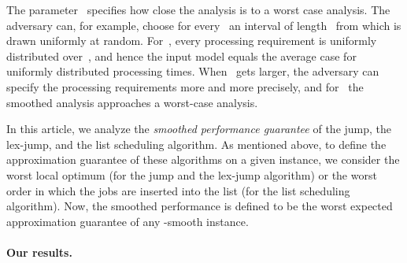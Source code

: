 \documentclass[a4paper,11pt,fleqn]{article}
\begin{document}
The parameter~ specifies how close the analysis is to a worst case analysis. The adversary can, for example, choose for every~ an interval of length~ from which  is drawn uniformly at random. For~, every processing requirement is uniformly distributed over~, and hence the input model equals the average case for uniformly distributed processing times. When~ gets larger, the adversary can specify the processing requirements more and more precisely, and for~ the smoothed analysis approaches a worst-case analysis.
 
In this article, we analyze the \emph{smoothed performance guarantee}
of the jump, the lex-jump, and the list scheduling algorithm. As mentioned above, 
to define the approximation guarantee of these algorithms on a given instance, we
consider the worst local optimum (for the jump and the lex-jump algorithm) or the worst order in which the jobs are inserted into the list (for the list scheduling algorithm). 
Now, the smoothed performance is defined to be the worst expected approximation guarantee of any
-smooth instance.  

\paragraph{Our results.}
\end{document}
